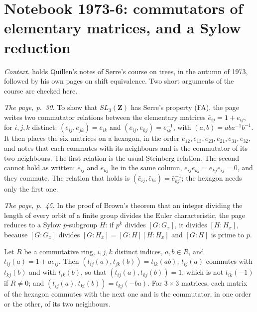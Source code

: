 \section[Notebook 1973-6: commutators of elementary matrices; a Sylow reduction]{Notebook 1973-6: commutators of elementary matrices, and a Sylow reduction\protect{}}\label{sec:quillen-1973-6}

\emph{Context.}  holds Quillen's notes of Serre's course on trees, in the autumn of 1973, followed by his own pages on shift equivalence. Two short arguments of the course are checked here.

\emph{The page, p.~30.} To show that $SL_3(\mathbf Z)$ has Serre's property (FA), the page writes two commutator relations between the elementary matrices $\bar e_{ij} = 1 + e_{ij}$, for $i, j, k$ distinct: $(\bar e_{ij}, \bar e_{jk}) = \bar e_{ik}$ and $(\bar e_{ij}, \bar e_{kj}) = \bar e_{ik}^{-1}$, with $(a, b) = aba^{-1}b^{-1}$. It then places the six matrices on a hexagon, in the order $\bar e_{12}, \bar e_{13}, \bar e_{23}, \bar e_{21}, \bar e_{31}, \bar e_{32}$, and notes that each commutes with its neighbours and is the commutator of its two neighbours. The first relation is the usual Steinberg relation. The second cannot hold as written: $\bar e_{ij}$ and $\bar e_{kj}$ lie in the same column, $e_{ij}e_{kj} = e_{kj}e_{ij} = 0$, and they commute. The relation that holds is $(\bar e_{ij}, \bar e_{ki}) = \bar e_{kj}^{-1}$; the hexagon needs only the first one.

\emph{The page, p.~45.} In the proof of Brown's theorem that an integer dividing the length of every orbit of a finite group divides the Euler characteristic, the page reduces to a Sylow $p$-subgroup $H$: if $p^k$ divides $[G : G_x]$, it divides $[H : H_x]$, because $[G:G_x]$ divides $[G : H_x] = [G : H][H : H_x]$ and $[G : H]$ is prime to $p$.

\begin{encadre}
\begin{theoreme}\label{thm:quillen-1973-6-a}
Let $R$ be a commutative ring, $i, j, k$ distinct indices, $a, b \in R$, and $t_{ij}(a) = 1 + a e_{ij}$. Then $(t_{ij}(a), t_{jk}(b)) = t_{ik}(ab)$; $t_{ij}(a)$ commutes with $t_{kj}(b)$ and with $t_{ik}(b)$, so that $(t_{ij}(a), t_{kj}(b)) = 1$, which is not $t_{ik}(-1)$ if $R \ne 0$; and $(t_{ij}(a), t_{ki}(b)) = t_{kj}(-ba)$. For $3 \times 3$ matrices, each matrix of the hexagon commutes with the next one and is the commutator, in one order or the other, of its two neighbours.
\end{theoreme}
\end{encadre}

